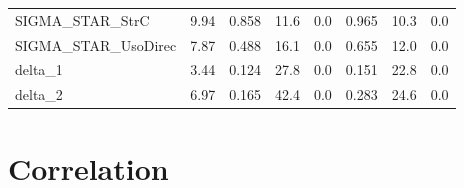 \begin{tabular}{lrrrrrrr}
SIGMA\_STAR\_StrC     &    9.94 &    0.858 &    11.6 &      0.0 &         0.965 &         10.3 &           0.0 \\
SIGMA\_STAR\_UsoDirec &    7.87 &    0.488 &    16.1 &      0.0 &         0.655 &         12.0 &           0.0 \\
delta\_1             &    3.44 &    0.124 &    27.8 &      0.0 &         0.151 &         22.8 &           0.0 \\
delta\_2             &    6.97 &    0.165 &    42.4 &      0.0 &         0.283 &         24.6 &           0.0 \\
\bottomrule
\end{tabular}

\section{Correlation}

